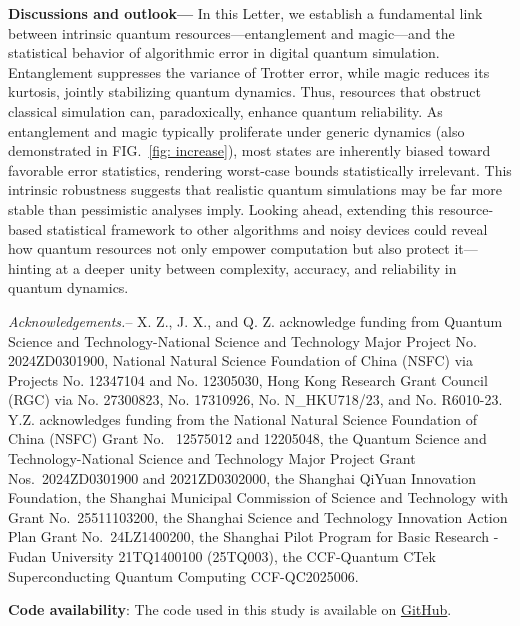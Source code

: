 \documentclass[showpacs,amsmath,amssymb,twocolumn,aps,pra,superscriptaddress,notitlepage,10pt]{revtex4-2}
\begin{document}
\vspace{0.2cm}
\noindent\textbf{Discussions and outlook---} In this Letter, we establish a fundamental link between intrinsic quantum resources—entanglement and magic—and the statistical behavior of algorithmic error in digital quantum simulation. Entanglement suppresses the variance of Trotter error, while magic reduces its kurtosis, jointly stabilizing quantum dynamics.
Thus, resources that obstruct classical simulation can, paradoxically, enhance quantum reliability.
As entanglement and magic typically proliferate under generic dynamics \cite{kim2014testing,toniolo_dynamical_2025,Turkeshi_2025} (also demonstrated in FIG.~\ref{fig: increase}), most states are inherently biased toward favorable error statistics, rendering worst-case bounds statistically irrelevant. This intrinsic robustness suggests that realistic quantum simulations may be far more stable than pessimistic analyses imply.
Looking ahead, extending this resource-based statistical framework to other algorithms and noisy devices could reveal how quantum resources not only empower computation but also protect it—hinting at a deeper unity between complexity, accuracy, and reliability in quantum dynamics.

\vspace{0.2cm}
\textit{Acknowledgements.}--
X. Z., J. X., and Q. Z. acknowledge funding from Quantum Science and Technology-National Science and Technology Major Project No. 2024ZD0301900, National Natural Science Foundation of China (NSFC) via Projects No. 12347104 and No. 12305030, Hong Kong Research Grant Council (RGC) via No. 27300823, No. 17310926, No. N\_HKU718/23, and No. R6010-23. Y.Z. acknowledges funding  from the National Natural Science Foundation of China (NSFC) Grant No.~ 12575012 and 12205048, the Quantum Science and Technology-National Science and Technology Major Project Grant Nos.~2024ZD0301900 and 2021ZD0302000, the Shanghai QiYuan Innovation Foundation, the Shanghai Municipal Commission of Science and Technology with Grant No.~25511103200, the Shanghai Science and Technology Innovation Action Plan Grant No.~24LZ1400200, the Shanghai Pilot Program for Basic Research - Fudan University 21TQ1400100 (25TQ003), the CCF-Quantum CTek Superconducting Quantum Computing CCF-QC2025006.

\textbf{Code availability}: The code used in this study is available on \href{https://github.com/Xran-ZH/Quantum-Resource-and-Quantum-Simulation}{GitHub}.
\end{document}

